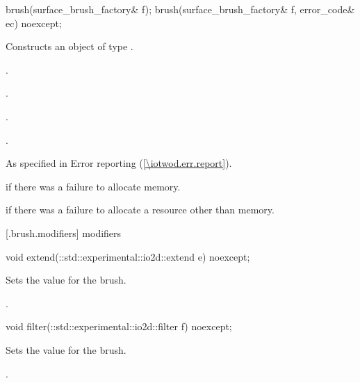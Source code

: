 \begin{itemdecl}
    brush(surface_brush_factory& f);
    brush(surface_brush_factory& f, error_code& ec) noexcept;
\end{itemdecl}
\begin{itemdescr}
	\pnum
	\effects
	Constructs an object of type .
	
	\pnum
	\postconditions
	.
	
	.
	
	.
	
	.

	\pnum
	\throws
	As specified in Error reporting (\ref{\iotwod.err.report}).
	
	\pnum
	\errors
	 if there was a failure to allocate memory.
	
	 if there was a failure to allocate a resource other than memory.
	
\end{itemdescr}

 [\iotwod.brush.modifiers]{ modifiers}

\begin{itemdecl}
    void extend(::std::experimental::io2d::extend e) noexcept;
\end{itemdecl}
\begin{itemdescr}
	\pnum
	\effects
	Sets the  value for the brush.
	
	\pnum
	\postconditions
	.
	
\end{itemdescr}

\begin{itemdecl}
    void filter(::std::experimental::io2d::filter f) noexcept;
\end{itemdecl}
\begin{itemdescr}
	\pnum
	\effects
	Sets the  value for the brush.
	
	\pnum
	\postconditions
	.
	
\end{itemdescr}

